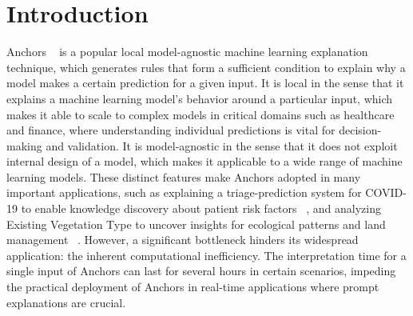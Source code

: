 \section{Introduction}


Anchors ~\cite{Anchor} is a popular local model-agnostic machine learning explanation technique, which generates rules that form a sufficient condition to explain why a model makes a certain prediction for a given input.
It is local in the sense that it explains a machine learning model's behavior around a particular input, which makes it able to scale to complex models in critical domains such as healthcare and finance, where understanding individual predictions is vital for decision-making and validation. 
It is model-agnostic in the sense that it does not exploit internal design of a model, which makes it applicable to a wide range of machine learning models.
These distinct features make Anchors adopted in many important applications, such as explaining a triage-prediction system for COVID-19 to enable knowledge discovery about patient risk factors ~\cite{KHANNA2023100246}, and analyzing Existing Vegetation Type to uncover insights for ecological patterns and land management ~\cite{GANJI2023317}.
However, a significant bottleneck hinders its widespread application: the inherent computational inefficiency. The interpretation time for a single input of Anchors can last for several hours in certain scenarios, impeding the practical deployment of Anchors in real-time applications where prompt explanations are crucial.

